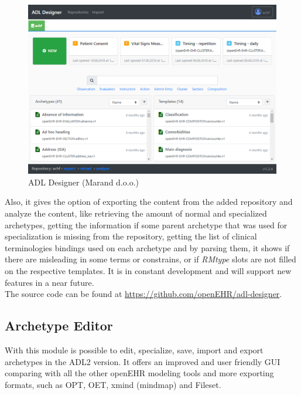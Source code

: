 \documentclass[mim_thesis.tex]{subfiles}
\begin{document}
\begin{figure}[H]
	\centering
    \includegraphics[width=1\textwidth]{img/adldesigner.PNG}
	\caption{ADL Designer (Marand d.o.o.)}
	\label{fig:adldesigner}
\end{figure}

Also, it gives the option of exporting the content from the added repository and analyze the content, like retrieving the amount of normal and specialized archetypes, getting the information if some parent archetype that was used for specialization is missing from the repository, getting the list of clinical terminologies bindings used on each archetype and by parsing them, it shows if there are misleading in some terms or constrains, or if \textit{RMtype} slots are not filled on the respective templates. It is in constant development and will support new features in a near future.  \\

The source code can be found at \url{https://github.com/openEHR/adl-designer}. 

\subsection{Archetype Editor}

With this module is possible to edit, specialize, save, import and export archetypes in the ADL2 version. It offers an improved and user friendly GUI comparing with all the other openEHR modeling tools and more exporting formats, such as OPT, OET, xmind (mindmap) and Fileset.\\
\end{document}
